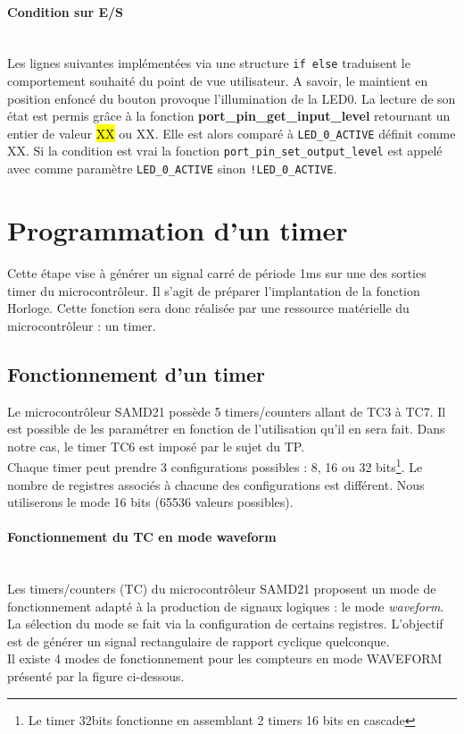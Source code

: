 \documentclass[a4paper]{article}
\begin{document}
	\paragraph{Condition sur E/S}
	~~\\
	Les lignes suivantes implémentées via une structure \texttt{if else} traduisent le comportement souhaité du point de vue utilisateur. A savoir, le maintient en position enfoncé du bouton provoque l'illumination de la LED0. La lecture de son état est permis grâce à la fonction \textbf{port\_pin\_get\_input\_level} retournant un entier de valeur \hl{XX} ou XX. Elle est alors comparé à \texttt{LED\_0\_ACTIVE} définit comme XX. Si la condition est vrai la fonction \texttt{port\_pin\_set\_output\_level} est appelé avec comme paramètre \texttt{LED\_0\_ACTIVE} sinon \texttt{!LED\_0\_ACTIVE}.
	
	
	\newpage
	\section{Programmation d'un timer}
	Cette étape vise à générer un signal carré de période 1ms sur une des sorties timer du microcontrôleur. Il s'agit  de préparer l'implantation de la fonction Horloge. Cette fonction sera donc réalisée par une ressource matérielle du microcontrôleur : un timer.
	\subsection{Fonctionnement d'un timer}
	Le microcontrôleur SAMD21 possède 5 timers/counters allant de TC3 à TC7. Il est possible de les paramétrer en fonction de l’utilisation qu’il en sera fait. Dans notre cas, le timer TC6 est imposé par le sujet du TP.\\
	Chaque timer peut prendre 3 configurations possibles : 8, 16 ou 32 bits\footnote{Le timer 32bits fonctionne en assemblant 2 timers 16 bits en cascade}. Le nombre de registres associés à chacune des configurations est différent. Nous utiliserons le mode 16 bits (65536 valeurs possibles).  \\
	\paragraph{Fonctionnement du TC en mode waveform}
	~~\\
	Les timers/counters (TC) du microcontrôleur SAMD21 proposent un mode de fonctionnement adapté à la production de signaux logiques : le mode {\sl waveform}. La sélection du mode se fait via la configuration de certains registres. L'objectif est de générer un signal rectangulaire de rapport cyclique quelconque. \\
	Il existe 4 modes de fonctionnement pour les compteurs en mode WAVEFORM présenté par la figure ci-dessous. \\
	
\end{document}
